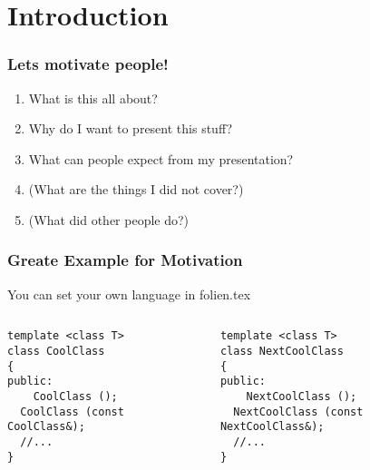 \section{Introduction}


\begin{frame}
\frametitle{Lets motivate people!}
\begin{enumerate}
\item What is this all about?
\item Why do I want to present this stuff? 
\item What can people expect from my presentation?
\item (What are the things I did not cover?)
\item (What did other people do?)
\end{enumerate}
\end{frame}


\begin{frame}[fragile]
\frametitle{Greate Example for Motivation}
You can set your own language in folien.tex
\begin{columns}
\begin{column}{0.5\textwidth}
\begin{lstlisting}[basicstyle=\small,keywordstyle=\small\color{blue}]
template <class T>
class CoolClass
{
public:
	CoolClass ();
  CoolClass (const CoolClass&);
  //...
}
\end{lstlisting}
\end{column}
\begin{column}{0.5\textwidth}
\begin{lstlisting}[basicstyle=\small,keywordstyle=\small\color{blue}]
template <class T>
class NextCoolClass
{
public:
	NextCoolClass ();
  NextCoolClass (const NextCoolClass&);
  //...
}
\end{lstlisting}
\end{column}
\end{columns}
\end{frame}
